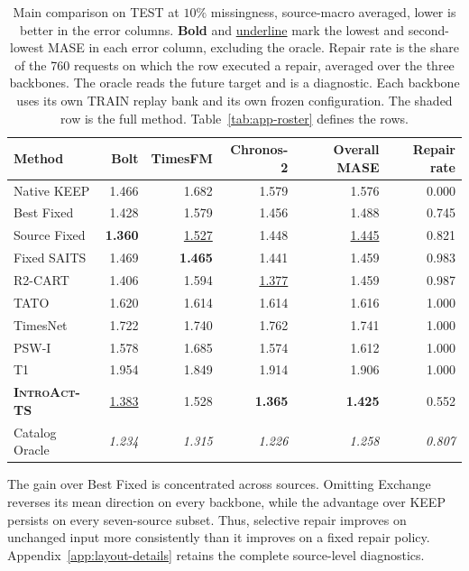 \documentclass{article}
\newcommand{\best}[1]{\textbf{#1}}
\newcommand{\second}[1]{\underline{#1}}
\newcommand{\oracle}[1]{\textit{\textcolor{phgray}{#1}}}
\newcommand{\introact}{\textsc{IntroAct-TS}}
\begin{document}
\begin{table}[t]
  \caption{Main comparison on TEST at $10\%$ missingness, source-macro averaged, lower is
  better in the error columns. \best{Bold} and \second{underline} mark the lowest and second-lowest MASE
  in each error column, excluding the oracle. Repair rate is the share of
  the 760 requests on which the row executed a repair, averaged over the three backbones. The
  oracle reads the future target and is a diagnostic. Each backbone uses its own TRAIN replay
  bank and its own frozen configuration. The shaded row is the full method. Table~\ref{tab:app-roster} defines the rows.}
  \label{tab:main}
  \centering
  \small
  \setlength{\tabcolsep}{3.5pt}
\begin{tabularx}{\textwidth}{@{}Xrrrrr@{}}
    \toprule
    Method & Bolt & TimesFM & Chronos-2 & Overall MASE & Repair rate \\
    \midrule
Native KEEP & 1.466 & 1.682 & 1.579 & 1.576 & 0.000 \\
    \midrule
Best Fixed & 1.428 & 1.579 & 1.456 & 1.488 & 0.745 \\
Source Fixed & \best{1.360} & \second{1.527} & 1.448 & \second{1.445} & 0.821 \\
Fixed SAITS & 1.469 & \best{1.465} & 1.441 & 1.459 & 0.983 \\
R2-CART & 1.406 & 1.594 & \second{1.377} & 1.459 & 0.987 \\
    \midrule
TATO & 1.620 & 1.614 & 1.614 & 1.616 & 1.000 \\
TimesNet & 1.722 & 1.740 & 1.762 & 1.741 & 1.000 \\
PSW-I & 1.578 & 1.685 & 1.574 & 1.612 & 1.000 \\
T1 & 1.954 & 1.849 & 1.914 & 1.906 & 1.000 \\
    \midrule
\rowcolor{bestgray}\textbf{\introact{}} & \second{1.383} & 1.528 & \best{1.365} & \best{1.425} & 0.552 \\
    \midrule
Catalog Oracle & \oracle{1.234} & \oracle{1.315} & \oracle{1.226} & \oracle{1.258} & \oracle{0.807} \\
    \bottomrule
  \end{tabularx}
\end{table}

The gain over Best Fixed is concentrated across sources. Omitting Exchange reverses its
mean direction on every backbone, while the advantage over KEEP persists on every
seven-source subset. Thus, selective repair improves on unchanged input more consistently
than it improves on a fixed repair policy. Appendix~\ref{app:layout-details} retains
the complete source-level diagnostics.
\end{document}
